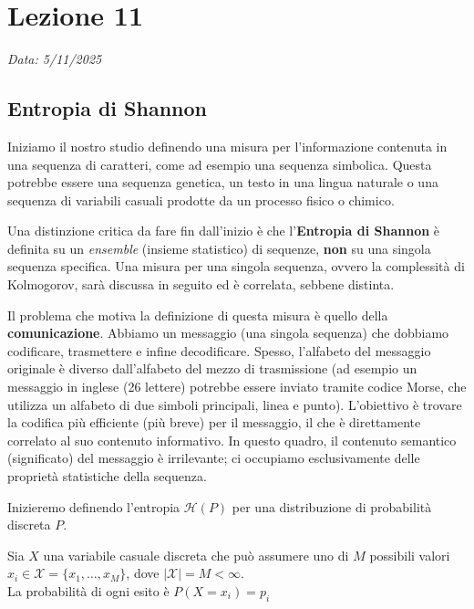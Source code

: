\chapter{Lezione 11}
\label{chap:lezione_11} 

\begin{flushright}
\textit{Data: 5/11/2025}
\end{flushright}

\section{Entropia di Shannon}

Iniziamo il nostro studio definendo una misura per l'informazione contenuta in una sequenza di caratteri, come ad esempio una sequenza simbolica. Questa potrebbe essere una sequenza genetica, un testo in una lingua naturale o una sequenza di variabili casuali prodotte da un processo fisico o chimico. 

\noindent Una distinzione critica da fare fin dall'inizio è che l'\textbf{Entropia di Shannon} è definita su un \textit{ensemble} (insieme statistico) di sequenze, \textbf{non} su una singola sequenza specifica. Una misura per una singola sequenza, ovvero la complessità di Kolmogorov, sarà discussa in seguito ed è correlata, sebbene distinta.


\noindent Il problema che motiva la definizione di questa misura è quello della \textbf{comunicazione}. Abbiamo un messaggio (una singola sequenza) che dobbiamo codificare, trasmettere e infine decodificare. Spesso, l'alfabeto del messaggio originale è diverso dall'alfabeto del mezzo di trasmissione (ad esempio un messaggio in inglese (26 lettere) potrebbe essere inviato tramite codice Morse, che utilizza un alfabeto di due simboli principali, linea e punto).
L'obiettivo è trovare la codifica più efficiente (più breve) per il messaggio, il che è direttamente correlato al suo contenuto informativo. In questo quadro, il contenuto semantico (significato) del messaggio è irrilevante; ci occupiamo esclusivamente delle proprietà statistiche della sequenza.

Inizieremo definendo l'entropia $\mathcal{H}(P)$ per una distribuzione di probabilità discreta $P$.
\begin{tcolorbox}[colback=colorC!15, colframe=colorC!70!colorB,  title=\textbf{Definizione della Variabile Casuale Discreta $X$}]
\begin{center}
    Sia $X$ una variabile casuale discreta che può assumere uno di $M$ possibili valori\\
$x_i \in \mathcal{X} = \{x_1, \dots, x_M\}$, dove $|\mathcal{X}| = M < \infty$.\\
La probabilità di ogni esito è $P(X=x_i) = p_i$
\end{center}
\end{tcolorbox}

